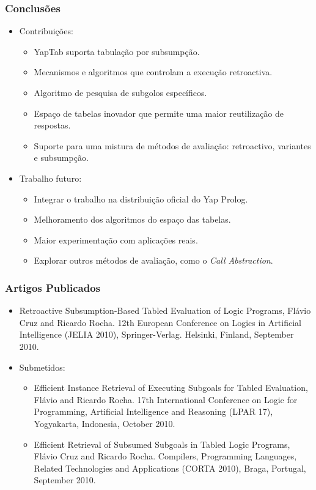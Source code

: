 \documentclass{beamer}
\begin{document}
\begin{frame}
   \frametitle{Conclusões}
   \begin{itemize}
      \item Contribuições:
      \begin{itemize}
         \item YapTab suporta tabulação por subsumpção.
         \item Mecanismos e algoritmos que controlam a execução retroactiva.
         \item Algoritmo de pesquisa de subgolos específicos.
         \item Espaço de tabelas inovador que permite uma maior reutilização de respostas.
         \item Suporte para uma mistura de métodos de avaliação: retroactivo, variantes e subsumpção.
         \pause
      \end{itemize}
      \item Trabalho futuro:
      \begin{itemize}
         \item Integrar o trabalho na distribuição oficial do Yap Prolog.
         \item Melhoramento dos algoritmos do espaço das tabelas.
         \item Maior experimentação com aplicações reais.
         \item Explorar outros métodos de avaliação, como o \emph{Call Abstraction}.
         \pause
      \end{itemize}
   \end{itemize}
\end{frame}

\begin{frame}
   \frametitle{Artigos Publicados}
   \begin{itemize}
      \item Retroactive Subsumption-Based Tabled Evaluation of Logic Programs, Flávio Cruz and Ricardo Rocha. 12th European Conference on Logics in Artificial Intelligence (JELIA 2010), Springer-Verlag. Helsinki, Finland, September 2010.
      \item Submetidos:
         \begin{itemize}
      \item Efficient Instance Retrieval of Executing Subgoals for Tabled Evaluation, Flávio and Ricardo Rocha. 17th International Conference on Logic for Programming, Artificial Intelligence and Reasoning (LPAR 17), Yogyakarta, Indonesia, October 2010.
      \item Efficient Retrieval of Subsumed Subgoals in Tabled Logic Programs, Flávio Cruz and Ricardo Rocha. Compilers, Programming Languages, Related Technologies and Applications (CORTA 2010), Braga, Portugal, September 2010.
   \end{itemize}
   \end{itemize}
\end{frame}
   
\end{document}
